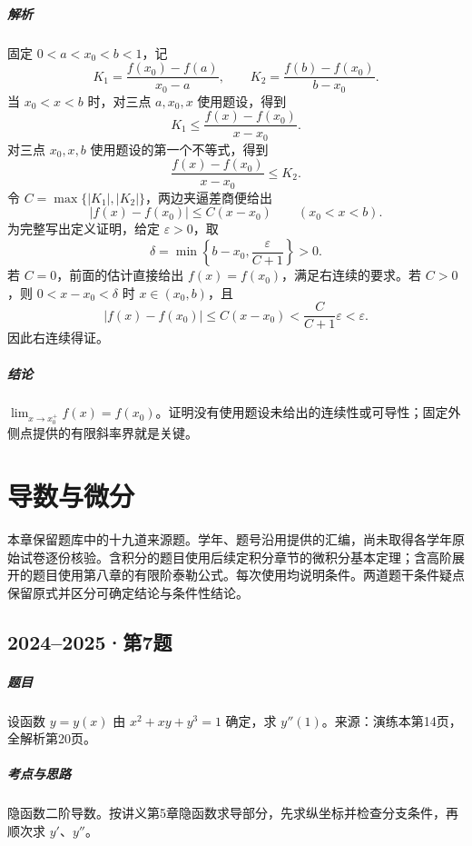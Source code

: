 \documentclass[UTF8,fontset=fandol,12pt,oneside,openany]{ctexrep}
\theoremstyle{definition}
\begin{document}
\paragraph{解析}
固定 $0<a<x_0<b<1$，记
\[
 K_1=\frac{f(x_0)-f(a)}{x_0-a},\qquad
 K_2=\frac{f(b)-f(x_0)}{b-x_0}.
\]
当 $x_0<x<b$ 时，对三点 $a,x_0,x$ 使用题设，得到
\[
 K_1\le \frac{f(x)-f(x_0)}{x-x_0}.
\]
对三点 $x_0,x,b$ 使用题设的第一个不等式，得到
\[
 \frac{f(x)-f(x_0)}{x-x_0}\le K_2.
\]
令 $C=\max\{|K_1|,|K_2|\}$，两边夹逼差商便给出
\[
 |f(x)-f(x_0)|\le C(x-x_0)\qquad(x_0<x<b).
\]
为完整写出定义证明，给定 $\varepsilon>0$，取
\[
 \delta=\min\left\{b-x_0,\frac{\varepsilon}{C+1}\right\}>0.
\]
若 $C=0$，前面的估计直接给出 $f(x)=f(x_0)$，满足右连续的要求。若 $C>0$，则 $0<x-x_0<\delta$ 时 $x\in(x_0,b)$，且
\[
 |f(x)-f(x_0)|\le C(x-x_0)
 <\frac{C}{C+1}\varepsilon<\varepsilon.
\]
因此右连续得证。

\paragraph{结论}
$\displaystyle\lim_{x\to x_0^+}f(x)=f(x_0)$。证明没有使用题设未给出的连续性或可导性；固定外侧点提供的有限斜率界就是关键。


\chapter{导数与微分}
\label{exam:05:chapter}
本章保留题库中的十九道来源题。学年、题号沿用提供的汇编，尚未取得各学年原始试卷逐份核验。含积分的题目使用后续定积分章节的微积分基本定理；含高阶展开的题目使用第八章的有限阶泰勒公式。每次使用均说明条件。两道题干条件疑点保留原式并区分可确定结论与条件性结论。

\par\addvspace{18pt}\noindent\begin{minipage}{\linewidth}
\section{2024--2025·第7题}
\paragraph{题目}设函数 $y=y(x)$ 由 $x^2+xy+y^3=1$ 确定，求 $y''(1)$。来源：演练本第14页，全解析第20页。
\end{minipage}\par
\paragraph{考点与思路}隐函数二阶导数。按讲义第5章隐函数求导部分，先求纵坐标并检查分支条件，再顺次求 $y'$、$y''$。
\end{document}

